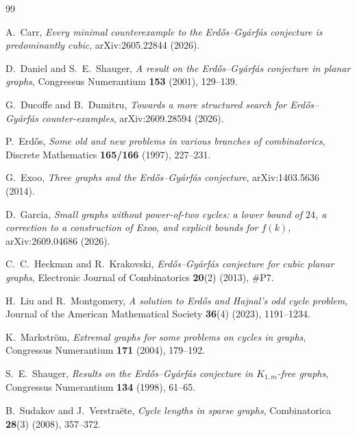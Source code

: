 \documentclass[11pt,reqno]{amsart}
\theoremstyle{plain}
\theoremstyle{definition}
\theoremstyle{remark}
\DeclareRobustCommand{\_}{\ifmmode\text{\textunderscore}\else\textunderscore\allowbreak\fi}
\begin{document}
\begin{thebibliography}{99}

A.~Carr,
\emph{Every minimal counterexample to the Erd\H{o}s--Gy\'arf\'as conjecture is predominantly cubic},
arXiv:2605.22844 (2026).

D.~Daniel and S.~E.~Shauger,
\emph{A result on the Erd\H{o}s--Gy\'arf\'as conjecture in planar graphs},
Congressus Numerantium \textbf{153} (2001), 129--139.

G.~Ducoffe and B.~Dumitru,
\emph{Towards a more structured search for Erd\H{o}s--Gy\'arf\'as counter-examples},
arXiv:2609.28594 (2026).

P.~Erd\H{o}s,
\emph{Some old and new problems in various branches of combinatorics},
Discrete Mathematics \textbf{165/166} (1997), 227--231.

G.~Exoo,
\emph{Three graphs and the Erd\H{o}s--Gy\'arf\'as conjecture},
arXiv:1403.5636 (2014).

D.~Garcia,
\emph{Small graphs without power-of-two cycles: a lower bound of $24$, a correction to a construction of Exoo, and explicit bounds for $f(k)$},
arXiv:2609.04686 (2026).

C.~C.~Heckman and R.~Krakovski,
\emph{Erd\H{o}s--Gy\'arf\'as conjecture for cubic planar graphs},
Electronic Journal of Combinatorics \textbf{20}(2) (2013), \#P7.

H.~Liu and R.~Montgomery,
\emph{A solution to Erd\H{o}s and Hajnal's odd cycle problem},
Journal of the American Mathematical Society \textbf{36}(4) (2023), 1191--1234.

K.~Markstr\"om,
\emph{Extremal graphs for some problems on cycles in graphs},
Congressus Numerantium \textbf{171} (2004), 179--192.

S.~E.~Shauger,
\emph{Results on the Erd\H{o}s--Gy\'arf\'as conjecture in $K_{1,m}$-free graphs},
Congressus Numerantium \textbf{134} (1998), 61--65.

B.~Sudakov and J.~Verstra\"ete,
\emph{Cycle lengths in sparse graphs},
Combinatorica \textbf{28}(3) (2008), 357--372.

\end{thebibliography}
\end{document}
